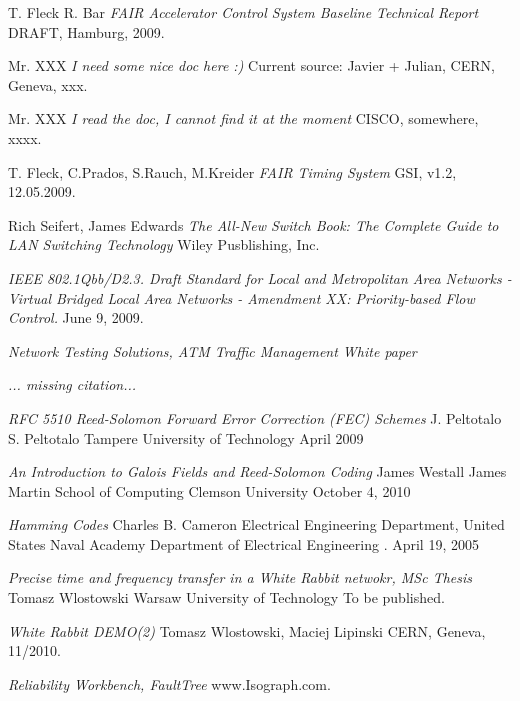 \begin{thebibliography}{9}
   T. Fleck 
   R. Bar 
  \emph{FAIR Accelerator Control System 
        Baseline Technical Report }
  DRAFT,
  Hamburg,
  2009.

  Mr. XXX
  \emph{I need some nice doc here :) }
  Current source: Javier + Julian,
  CERN, Geneva,
  xxx.

  Mr. XXX
  \emph{I read the doc, I cannot find it at the moment }
  CISCO,
  somewhere,
  xxxx.

  T. Fleck, C.Prados, S.Rauch, M.Kreider
  \emph{FAIR Timing System}
  GSI,
  v1.2,
  12.05.2009.

 Rich Seifert, James Edwards
 \emph{The All-New Switch Book: The Complete Guide to LAN Switching Technology}
 Wiley Pusblishing, Inc. 

 \emph{IEEE 802.1Qbb/D2.3. Draft Standard for Local and Metropolitan Area
      Networks - Virtual Bridged Local Area Networks - Amendment XX:
Priority-based Flow Control.}  
   June 9,
  2009.

 \emph{Network Testing Solutions, ATM Traffic Management White paper}

 \emph{... missing citation...}

 \emph{RFC 5510 Reed-Solomon Forward Error Correction (FEC) Schemes}
J. Peltotalo
S. Peltotalo
Tampere University of Technology
April 2009

\emph{An Introduction to Galois Fields and Reed-Solomon Coding}
James Westall
James Martin
School of Computing
Clemson University
October 4, 2010

\emph{Hamming Codes}
Charles B. Cameron
Electrical Engineering Department, 
United States Naval Academy
Department of Electrical Engineering .
April 19, 2005

 \emph{Precise time and frequency transfer in a White Rabbit netwokr, MSc
Thesis}
  Tomasz Wlostowski
  Warsaw University of Technology
  To be published.

 \emph{White Rabbit DEMO(2)}
  Tomasz Wlostowski,
  Maciej Lipinski
  CERN, Geneva,
  11/2010.

 \emph{Reliability Workbench, FaultTree}
  www.Isograph.com.

\end{thebibliography}
